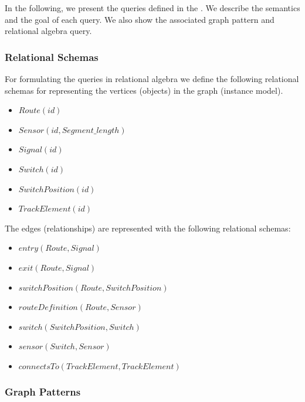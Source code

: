 In the following, we present the queries defined in the \tb{}. We describe the semantics and the goal of each query. We also show the associated graph pattern and relational algebra query.

\subsubsection{Relational Schemas}

For formulating the queries in relational algebra we define the following relational schemas for representing the vertices (objects) in the graph (instance model).

\begin{itemize}
  \item $ \mathit{Route}\left(\mathit{id}\right) $
  \item $ \mathit{Sensor}\left(\mathit{id}, \mathit{Segment\_length}\right) $
  \item $ \mathit{Signal}\left(\mathit{id}\right) $
  \item $ \mathit{Switch}\left(\mathit{id}\right) $
  \item $ \mathit{SwitchPosition}\left(\mathit{id}\right) $
  \item $ \mathit{TrackElement}\left(\mathit{id}\right) $
\end{itemize}

The edges (relationships) are represented with the following relational schemas:

\begin{itemize}
  \item $ \mathit{entry}\left(\mathit{Route}, \mathit{Signal}\right) $
  \item $ \mathit{exit}\left(\mathit{Route}, \mathit{Signal}\right) $
  \item $ \mathit{switchPosition}\left(\mathit{Route}, \mathit{SwitchPosition}\right) $
  \item $ \mathit{routeDefinition}\left(\mathit{Route}, \mathit{Sensor}\right) $
  \item $ \mathit{switch}\left(\mathit{SwitchPosition}, \mathit{Switch}\right) $
  \item $ \mathit{sensor}\left(\mathit{Switch}, \mathit{Sensor}\right) $
  \item $ \mathit{connectsTo}\left(\mathit{TrackElement}, \mathit{TrackElement}\right) $
\end{itemize}

\subsubsection{Graph Patterns}

